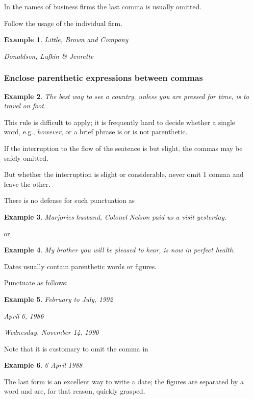 \documentclass{article}
\newtheorem{example}{Example}
\begin{document}
In the names of business firms the last comma is usually omitted.

Follow the usage of the individual firm.
\begin{example}
	Little, Brown and Company
	
	Donaldson, Lufkin \& Jenrette
\end{example}


\subsubsection{Enclose parenthetic expressions between commas}
\begin{example}
	The best way to see a country, unless you are pressed for time, is to travel on foot.
\end{example}
This rule is difficult to apply; it is frequently hard to decide whether a single word, e.g., {\it however}, or a brief phrase is or is not parenthetic.

If the interruption to the flow of the sentence is but slight, the commas may be safely omitted.

But whether the interruption is slight or considerable, never omit 1 comma and leave the other.

There is no defense for such punctuation as
\begin{example}
	Marjories husband, Colonel Nelson paid us a visit yesterday.
\end{example}
or
\begin{example}
	My brother you will be pleased to hear, is now in perfect health.
\end{example}
Dates usually contain parenthetic words or figures.

Punctuate as follows:
\begin{example}
	February to July, 1992
	
	April 6, 1986
	
	Wednesday, November 14, 1990
\end{example}
Note that it is customary to omit the comma in
\begin{example}
	6 April 1988
\end{example}
The last form is an excellent way to write a date; the figures are separated by a word and are, for that reason, quickly grasped.
\end{document}
